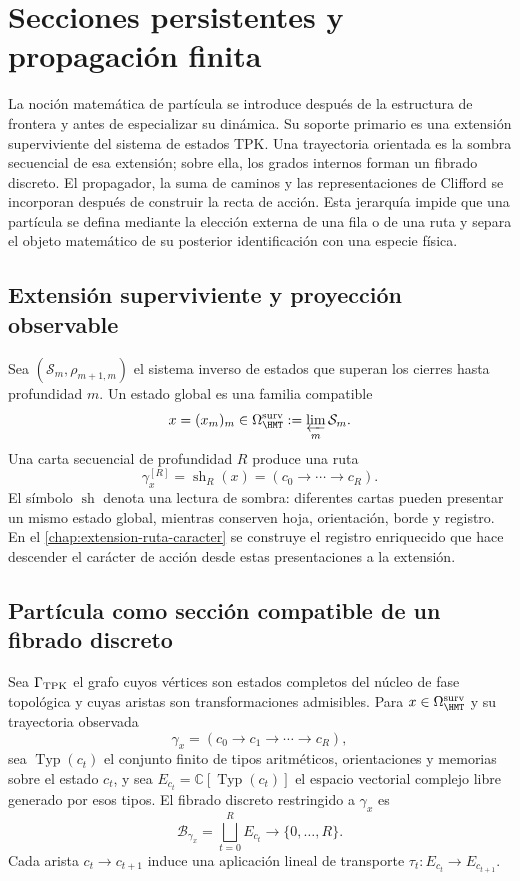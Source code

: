 \ifdefined\HMTIncludeParticleCore
\chapter{Secciones persistentes y propagación finita}
\label{chap:particula}

La noción matemática de partícula se introduce después de la estructura de
frontera y antes de especializar su dinámica. Su soporte primario es una
extensión superviviente del sistema de estados TPK\@. Una trayectoria
orientada es la sombra secuencial de esa extensión; sobre ella, los grados
internos forman un fibrado discreto. El propagador, la suma de caminos y las
representaciones de Clifford se incorporan después de construir la recta de
acción. Esta jerarquía impide que una partícula se defina mediante la elección
externa de una fila o de una ruta y separa el objeto matemático de su posterior
identificación con una especie física.

\section{Extensión superviviente y proyección observable}

Sea \((\mathcal S_m,\rho_{m+1,m})\) el sistema inverso de estados que
superan los cierres hasta profundidad \(m\). Un estado global es una familia
compatible
\[
 x=(x_m)_m\in\Omega_{\HMT}^{\rm surv}
 :=\varprojlim_m\mathcal S_m.
\]
Una carta secuencial de profundidad \(R\) produce una ruta
\[
 \gamma_x^{[R]}=\operatorname{sh}_R(x)
 =(c_0\longrightarrow\cdots\longrightarrow c_R).
\]
El símbolo \(\operatorname{sh}\) denota una lectura de sombra: diferentes
cartas pueden presentar un mismo estado global, mientras conserven hoja,
orientación, borde y registro. En el
\cref{chap:extension-ruta-caracter} se construye el registro enriquecido que
hace descender el carácter de acción desde estas presentaciones a la
extensión.

\section{Partícula como sección compatible de un fibrado discreto}

Sea \(\Gamma_{\rm TPK}\) el grafo cuyos vértices son estados completos del
núcleo de fase topológica y cuyas aristas son transformaciones admisibles.
Para \(x\in\Omega_{\HMT}^{\rm surv}\) y su trayectoria observada
\[
 \gamma_x=(c_0\longrightarrow c_1\longrightarrow\cdots
 \longrightarrow c_R),
\]
sea \(\operatorname{Typ}(c_t)\) el conjunto finito de tipos aritméticos,
orientaciones y memorias sobre el estado \(c_t\), y sea
\(E_{c_t}=\mathbb C[\operatorname{Typ}(c_t)]\) el espacio vectorial complejo
libre generado por esos tipos. El fibrado discreto restringido a \(\gamma_x\) es
\[
 \mathcal B_{\gamma_x}=\bigsqcup_{t=0}^{R}E_{c_t}
 \longrightarrow\{0,\ldots,R\}.
\]
Cada arista \(c_t\to c_{t+1}\) induce una aplicación lineal de transporte
\(\tau_t:E_{c_t}\to E_{c_{t+1}}\).

